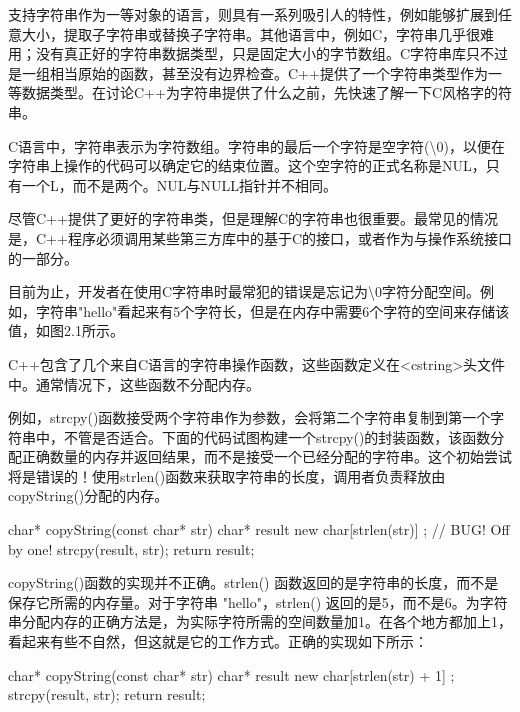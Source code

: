 
支持字符串作为一等对象的语言，则具有一系列吸引人的特性，例如能够扩展到任意大小，提取子字符串或替换子字符串。其他语言中，例如C，字符串几乎很难用；没有真正好的字符串数据类型，只是固定大小的字节数组。C字符串库只不过是一组相当原始的函数，甚至没有边界检查。C++提供了一个字符串类型作为一等数据类型。在讨论C++为字符串提供了什么之前，先快速了解一下C风格字的符串。


C语言中，字符串表示为字符数组。字符串的最后一个字符是空字符(\textbackslash{}0)，以便在字符串上操作的代码可以确定它的结束位置。这个空字符的正式名称是NUL，只有一个L，而不是两个。NUL与NULL指针并不相同。

尽管C++提供了更好的字符串类，但是理解C的字符串也很重要。最常见的情况是，C++程序必须调用某些第三方库中的基于C的接口，或者作为与操作系统接口的一部分。

目前为止，开发者在使用C字符串时最常犯的错误是忘记为\textbackslash{}0字符分配空间。例如，字符串"hello"看起来有5个字符长，但是在内存中需要6个字符的空间来存储该值，如图2.1所示。


C++包含了几个来自C语言的字符串操作函数，这些函数定义在<cstring>头文件中。通常情况下，这些函数不分配内存。

例如，strcpy()函数接受两个字符串作为参数，会将第二个字符串复制到第一个字符串中，不管是否适合。下面的代码试图构建一个strcpy()的封装函数，该函数分配正确数量的内存并返回结果，而不是接受一个已经分配的字符串。这个初始尝试将是错误的！使用strlen()函数来获取字符串的长度，调用者负责释放由copyString()分配的内存。

\begin{cpp}
char* copyString(const char* str)
{
    char* result { new char[strlen(str)] }; // BUG! Off by one!
    strcpy(result, str);
    return result;
}
\end{cpp}

copyString()函数的实现并不正确。strlen() 函数返回的是字符串的长度，而不是保存它所需的内存量。对于字符串 "hello"，strlen() 返回的是5，而不是6。为字符串分配内存的正确方法是，为实际字符所需的空间数量加1。在各个地方都加上1，看起来有些不自然，但这就是它的工作方式。正确的实现如下所示：

\begin{cpp}
char* copyString(const char* str)
{
    char* result { new char[strlen(str) + 1] };
    strcpy(result, str);
    return result;
}
\end{cpp}

